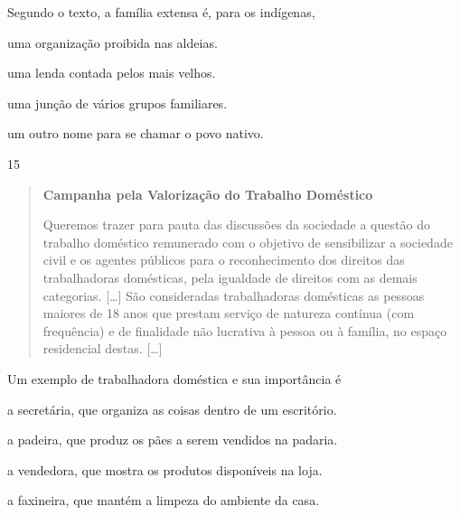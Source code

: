 \noindent{}Segundo o texto, a família extensa é, para os indígenas,

\begin{escolha}
\item uma organização proibida nas aldeias.

\item uma lenda contada pelos mais velhos.

\item uma junção de vários grupos familiares.

\item um outro nome para se chamar o povo nativo.
\end{escolha}


\pagebreak
\num{15}

\begin{quote}
\textbf{Campanha pela Valorização do Trabalho Doméstico}

Queremos trazer para pauta das discussões da sociedade a questão do
trabalho doméstico remunerado com o objetivo de sensibilizar a sociedade
civil e os agentes públicos para o reconhecimento dos direitos das
trabalhadoras domésticas, pela igualdade de direitos com as demais
categorias. {[}\ldots{}{]}
São consideradas trabalhadoras domésticas as pessoas maiores
de 18 anos que prestam serviço de natureza contínua (com frequência) e
de finalidade não lucrativa à pessoa ou à família, no espaço residencial
destas. {[}\ldots{}{]}

\end{quote}

\noindent{}Um exemplo de trabalhadora doméstica e sua importância é

\begin{escolha}
\item a secretária, que organiza as coisas dentro de um escritório.

\item a padeira, que produz os pães a serem vendidos na padaria.

\item a vendedora, que mostra os produtos disponíveis na loja.

\item a faxineira, que mantém a limpeza do ambiente da casa.
\end{escolha}



